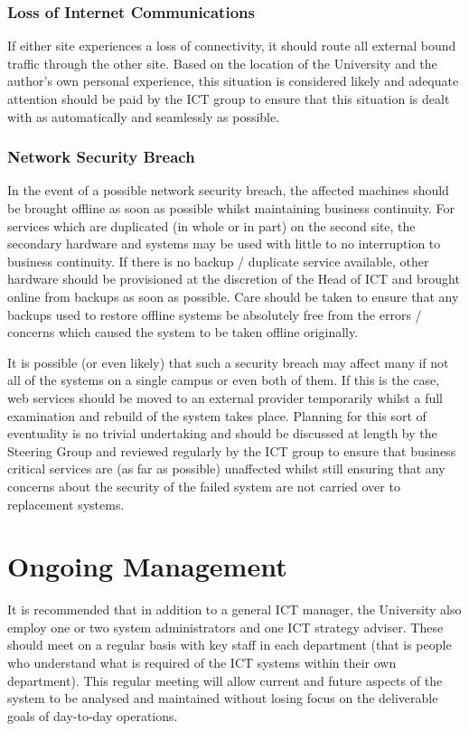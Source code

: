 \documentclass[a4paper, twoside]{article}
\begin{document}
\subsubsection{Loss of Internet Communications}
If either site experiences a loss of connectivity, it should route all external
bound traffic through the other site. Based on the location of the University
and the author's own personal experience, this situation is considered likely
and adequate attention should be paid by the ICT group to ensure that this
situation is dealt with as automatically and seamlessly as possible.

\subsubsection{Network Security Breach}
In the event of a possible network security breach, the affected machines should
be brought offline as soon as possible whilst maintaining business continuity.
For services which are duplicated (in whole or in part) on the second site, the
secondary hardware and systems may be used with little to no interruption to
business continuity. If there is no backup / duplicate service available, other
hardware should be provisioned at the discretion of the Head of ICT and brought
online from backups as soon as possible. Care should be taken to ensure that any
backups used to restore offline systems be absolutely free from the
errors / concerns which caused the system to be taken offline originally.

It is possible (or even likely) that such a security breach may affect many if
not all of the systems on a single campus or even both of them. If this is the
case, web services should be moved to an external provider temporarily whilst a
full examination and rebuild of the system takes place. Planning for this sort
of eventuality is no trivial undertaking and should be discussed at length by
the Steering Group and reviewed regularly by the ICT group to ensure that
business critical services are (as far as possible) unaffected whilst still
ensuring that any concerns about the security of the failed system are not
carried over to replacement systems.

\section{Ongoing Management}
\label{sec:manage}
It is recommended that in addition to a general ICT manager, the University also
employ one or two system administrators and one ICT strategy adviser. These
should meet on a regular basis with key staff in each department (that is people
who understand what is required of the ICT systems within their own department).
This regular meeting will allow current and future aspects of the system to be
analysed and maintained without losing focus on the deliverable goals of
day-to-day operations.
\end{document}
